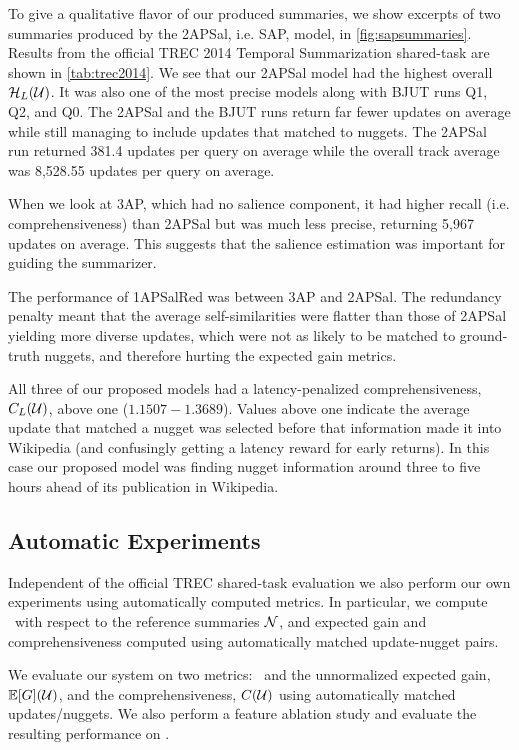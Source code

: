 

To give a qualitative flavor of our produced summaries, we show excerpts of two
summaries produced by the 2APSal, i.e. SAP, model, in
\autoref{fig:sapsummaries}.  Results from the official TREC 2014 Temporal
Summarization shared-task are shown in \autoref{tab:trec2014}. We see that our
2APSal model had the highest overall $\mathcal{H}_L(\mathcal{U})$. It was
also one of the most precise models along with BJUT runs Q1, Q2, and Q0. The
2APSal and the BJUT runs return far fewer updates on average while still
managing to include updates that matched to nuggets. The 2APSal run returned
381.4 updates per query on average while the overall track average was 8,528.55
updates per query on average. 

When we look at 3AP, which had no salience component, it had higher recall
(i.e. comprehensiveness) than 2APSal but was much less precise, returning 5,967
updates on average. This suggests that the salience estimation was important
for guiding the summarizer. 

The performance of 1APSalRed was between 3AP and 2APSal. The redundancy penalty
meant that the average self-similarities were flatter than those of 2APSal
yielding more diverse updates, which were not as likely to be matched to
ground-truth nuggets, and therefore hurting the expected gain metrics.

All three of our proposed models had a latency-penalized comprehensiveness,
$C_L(\mathcal{U})$, above one ($1.1507 - 1.3689$). Values above
one indicate the average update that matched a nugget was selected before that
information made it into Wikipedia (and confusingly getting a latency reward
for early returns). In this case our proposed model was finding nugget
information around three to five hours ahead of its publication in Wikipedia.  

\subsection{Automatic Experiments}

Independent of the official TREC shared-task evaluation we also perform our own
experiments using automatically computed metrics.  In particular, we compute
\rouge~with respect to the reference summaries $\mathcal{N}$, and expected gain
and comprehensiveness computed using automatically matched update-nugget pairs.

We evaluate our system on two metrics: \rouge~and the unnormalized expected
gain, $\mathbb{E}[G](\mathcal{U})$, and the comprehensiveness, $C(\mathcal{U})$
using automatically matched updates/nuggets.  We also perform a feature
ablation study and evaluate the resulting performance on \rouge.

